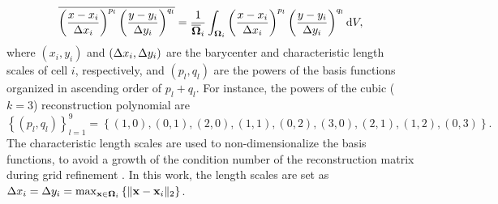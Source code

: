 \begin{equation}
    \overline{
        \left(\frac{x - x_{i}}{\mathrm\Delta x_i}\right)^{p_l}
        \left(\frac{y - y_{i}}{\mathrm\Delta y_i}\right)^{q_l}
    }= \dfrac{1}{\overline{\mathbf{\Omega}}_i}\int_{\mathbf{\Omega}_i}   \left(\frac{x - x_{i}}{\mathrm\Delta x_i}\right)^{p_l}
    \left(\frac{y - y_{i}}{\mathrm\Delta y_i}\right)^{q_l}  \dd V,
\end{equation}
where $\left(x_i,y_i\right)$ and $\left(\mathrm\Delta x_i, \mathrm\Delta y_i\right)$ are the barycenter and characteristic length scales of cell $i$, respectively, and $\left(p_l,q_l\right)$ are the powers of the basis functions organized in ascending order of $p_l+q_l$. For instance, the powers of the cubic ($k=3$) reconstruction polynomial are
\begin{equation}
    \left\{ \left(p_l,q_l\right) \right\}^9_{l=1}= \left\{ \left(1,0\right), \left(0,1\right), \left(2,0\right),\left(1,1\right),\left(0,2\right),\left(3,0\right),\left(2,1\right),\left(1,2\right),\left(0,3\right) \right\}.
\end{equation}
The characteristic length scales are used to non-dimensionalize the basis functions, to avoid a growth of the condition number of the reconstruction matrix during grid refinement \cite{abgrall1994essentially,friedrich1998weighted_WENO}. In this work, the length scales are set as $ \mathrm\Delta x_i = \mathrm\Delta y_i = \max_{\mathbf{x} \in \mathbf{\Omega}_i} \left\{\|\mathbf{x} - \mathbf{x}_{i}\|_2\right\}$.

